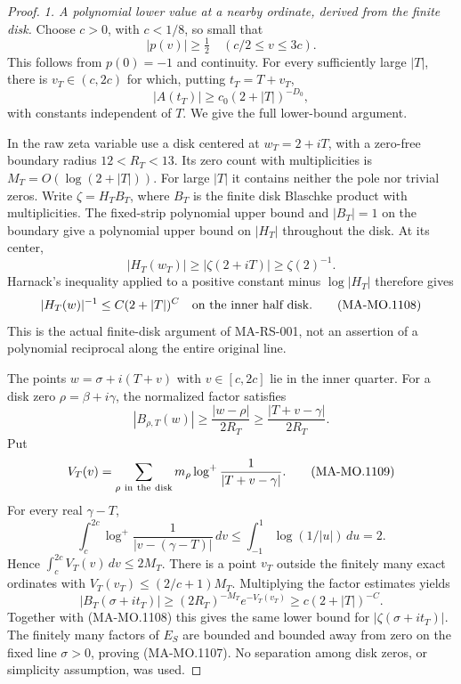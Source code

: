 \begin{proof}
\emph{1. A polynomial lower value at a nearby
ordinate, derived from the finite disk.}
Choose \(c>0\), with \(c<1/8\), so small that
\[
 |p(v)|\ge\tfrac12
                      \quad(c/2\le v\le3c).
\tag{MA-MO.1106}
\]
This follows from \(p(0)=-1\) and continuity.
For every sufficiently large \(|T|\), there
is \(v_T\in(c,2c)\) for which, putting
\(t_T=T+v_T\),
\[
                    |A(t_T)|\ge c_0(2+|T|)^{-D_0},
\tag{MA-MO.1107}
\]
with constants independent of \(T\).
We give the full lower-bound argument.

In the raw zeta variable use a disk centered
at \(w_T=2+iT\), with a zero-free boundary
radius \(12<R_T<13\).  Its zero count with
multiplicities is \(M_T=O(\log(2+|T|))\).
For large \(|T|\) it contains neither the
pole nor trivial zeros.  Write
\(\zeta=H_TB_T\), where \(B_T\) is the finite
disk Blaschke product with multiplicities.
The fixed-strip polynomial upper bound and
\(|B_T|=1\) on the boundary give a polynomial
upper bound on \(|H_T|\) throughout the disk.
At its center,
\[
 |H_T(w_T)|\ge|\zeta(2+iT)|\ge\zeta(2)^{-1}.
\]
Harnack's inequality applied to a positive
constant minus \(\log|H_T|\) therefore gives
\[
 |H_T(w)|^{-1}\le C(2+|T|)^C
                       \quad\hbox{on the inner half disk}.
\tag{MA-MO.1108}
\]
This is the actual finite-disk argument of
MA-RS-001, not an assertion of a polynomial
reciprocal along the entire original line.

The points \(w=\sigma+i(T+v)\) with
\(v\in[c,2c]\) lie in the inner quarter.
For a disk zero \(\rho=\beta+i\gamma\),
the normalized factor satisfies
\[
 |B_{\rho,T}(w)|\ge\frac{|w-\rho|}{2R_T}
                 \ge\frac{|T+v-\gamma|}{2R_T}.
\]
Put
\[
 V_T(v)=\sum_{\rho\ {\rm in\ the\ disk}}
                 m_\rho\log^+\frac1{|T+v-\gamma|}.
\tag{MA-MO.1109}
\]
For every real \(\gamma-T\),
\[
 \int_c^{2c}\log^+\frac1{|v-(\gamma-T)|}\,dv
       \le\int_{-1}^1\log(1/|u|)\,du=2 .
\]
Hence \(\int_c^{2c}V_T(v)\,dv\le2M_T\).
There is a point \(v_T\) outside the finitely
many exact ordinates with
\(V_T(v_T)\le(2/c+1)M_T\).
Multiplying the factor estimates yields
\[
 |B_T(\sigma+it_T)|
       \ge(2R_T)^{-M_T}e^{-V_T(v_T)}
                       \ge c(2+|T|)^{-C}.
\tag{MA-MO.1110}
\]
Together with (MA-MO.1108) this gives the
same lower bound for \(|\zeta(\sigma+it_T)|\).
The finitely many factors of \(E_S\) are
bounded and bounded away from zero on the
fixed line \(\sigma>0\), proving
(MA-MO.1107).  No separation among disk
zeros, or simplicity assumption, was used.


\end{proof}
